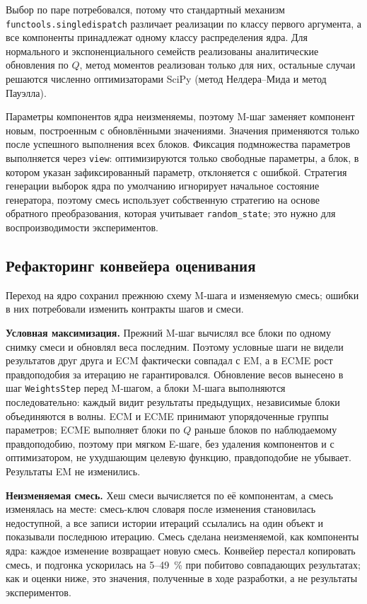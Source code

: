 Выбор по паре потребовался, потому что стандартный механизм \texttt{functools.singledispatch} различает реализации по классу первого аргумента, а все компоненты принадлежат одному классу распределения ядра. Для нормального и экспоненциального семейств реализованы аналитические обновления по $Q$, метод моментов реализован только для них, остальные случаи решаются численно оптимизаторами SciPy (метод Нелдера--Мида и метод Пауэлла).

Параметры компонентов ядра неизменяемы, поэтому M-шаг заменяет компонент новым, построенным с обновлёнными значениями. Значения применяются только после успешного выполнения всех блоков. Фиксация подмножества параметров выполняется через \texttt{view}: оптимизируются только свободные параметры, а блок, в котором указан зафиксированный параметр, отклоняется с ошибкой. Стратегия генерации выборок ядра по умолчанию игнорирует начальное состояние генератора, поэтому смесь использует собственную стратегию на основе обратного преобразования, которая учитывает \texttt{random\_state}; это нужно для воспроизводимости экспериментов.

\subsection{Рефакторинг конвейера оценивания}
\label{sec:migration-refactoring}

Переход на ядро сохранил прежнюю схему M-шага и изменяемую смесь; ошибки в них потребовали изменить контракты шагов и смеси.

\textbf{Условная максимизация.} Прежний M-шаг вычислял все блоки по одному снимку смеси и обновлял веса последним. Поэтому условные шаги не видели результатов друг друга и ECM фактически совпадал с EM, а в ECME рост правдоподобия за итерацию не гарантировался. Обновление весов вынесено в шаг \texttt{WeightsStep} перед M-шагом, а блоки M-шага выполняются последовательно: каждый видит результаты предыдущих, независимые блоки объединяются в волны. ECM и ECME принимают упорядоченные группы параметров; ECME выполняет блоки по $Q$ раньше блоков по наблюдаемому правдоподобию, поэтому при мягком E-шаге, без удаления компонентов и с оптимизатором, не ухудшающим целевую функцию, правдоподобие не убывает. Результаты EM не изменились.

\textbf{Неизменяемая смесь.} Хеш смеси вычисляется по её компонентам, а смесь изменялась на месте: смесь-ключ словаря после изменения становилась недоступной, а все записи истории итераций ссылались на один объект и показывали последнюю итерацию. Смесь сделана неизменяемой, как компоненты ядра: каждое изменение возвращает новую смесь. Конвейер перестал копировать смесь, и подгонка ускорилась на 5--49~\% при побитово совпадающих результатах; как и оценки ниже, это значения, полученные в ходе разработки, а не результаты экспериментов.

